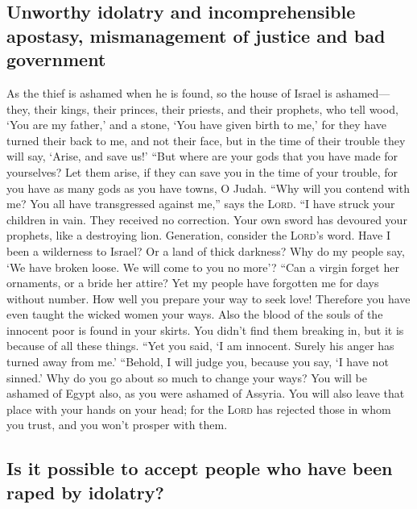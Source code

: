 \hypertarget{unworthy-idolatry-and-incomprehensible-apostasy-mismanagement-of-justice-and-bad-government}{%
\subsection{Unworthy idolatry and incomprehensible apostasy,
mismanagement of justice and bad
government}\label{unworthy-idolatry-and-incomprehensible-apostasy-mismanagement-of-justice-and-bad-government}}

 As the thief is ashamed when he is found, so the house
of Israel is ashamed--- they, their kings, their princes, their priests,
and their prophets,  who tell wood, `You are my father,'
and a stone, `You have given birth to me,' for they have turned their
back to me, and not their face, but in the time of their trouble they
will say, `Arise, and save us!'  ``But where are your
gods that you have made for yourselves? Let them arise, if they can save
you in the time of your trouble, for you have as many gods as you have
towns, O Judah.  ``Why will you contend with me? You all
have transgressed against me,'' says the \textsc{Lord}. 
``I have struck your children in vain. They received no correction. Your
own sword has devoured your prophets, like a destroying lion.
 Generation, consider the \textsc{Lord}'s word. Have I
been a wilderness to Israel? Or a land of thick darkness? Why do my
people say, `We have broken loose. We will come to you no more'?
 ``Can a virgin forget her ornaments, or a bride her
attire? Yet my people have forgotten me for days without number.
 How well you prepare your way to seek love! Therefore
you have even taught the wicked women your ways.  Also
the blood of the souls of the innocent poor is found in your skirts. You
didn't find them breaking in, but it is because of all these things.
 ``Yet you said, `I am innocent. Surely his anger has
turned away from me.' ``Behold, I will judge you, because you say, `I
have not sinned.'  Why do you go about so much to change
your ways? You will be ashamed of Egypt also, as you were ashamed of
Assyria.  You will also leave that place with your hands
on your head; for the \textsc{Lord} has rejected those in whom you
trust, and you won't prosper with them.

\hypertarget{is-it-possible-to-accept-people-who-have-been-raped-by-idolatry}{%
\subsection{Is it possible to accept people who have been raped by
idolatry?}\label{is-it-possible-to-accept-people-who-have-been-raped-by-idolatry}}

